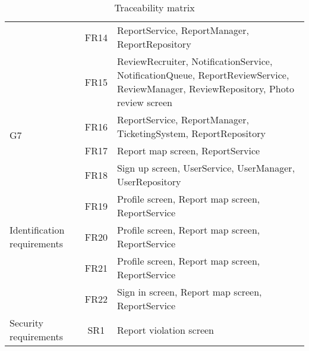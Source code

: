 \begin{table}[H]
\begin{tabular}{|p{2cm}|c|p{8cm}|}
        & FR14 & ReportService, ReportManager, ReportRepository \\ \cline{2-3}
        & FR15 & ReviewRecruiter, NotificationService, NotificationQueue, ReportReviewService, ReviewManager, ReviewRepository, Photo review screen \\ \hline
        \multirow{2}{2cm}{G7} & FR16 & ReportService, ReportManager, TicketingSystem, ReportRepository \\ \cline{2-3}
        & FR17 & Report map screen, ReportService \\ \hline
        \multirow{5}{2cm}{Identification requirements} & FR18 & Sign up screen, UserService, UserManager, UserRepository \\ \cline{2-3}
        & FR19 & Profile screen, Report map screen, ReportService \\ \cline{2-3}
        & FR20 & Profile screen, Report map screen, ReportService \\ \cline{2-3}
        & FR21 & Profile screen, Report map screen, ReportService \\ \cline{2-3}
        & FR22 & Sign in screen, Report map screen, ReportService \\ \hline
        Security requirements & SR1 & Report violation screen \\ \hline
    \end{tabular}
    \caption{\label{tbl:traceability-matrix} Traceability matrix}
\end{table}